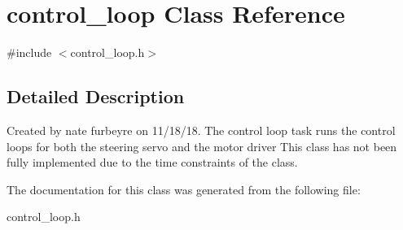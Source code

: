 \hypertarget{classcontrol__loop}{}\section{control\+\_\+loop Class Reference}
\label{classcontrol__loop}


{\ttfamily \#include $<$control\+\_\+loop.\+h$>$}



\subsection{Detailed Description}
Created by nate furbeyre on 11/18/18. The control loop task runs the control loops for both the steering servo and the motor driver This class has not been fully implemented due to the time constraints of the class. 

The documentation for this class was generated from the following file\+:\begin{DoxyCompactItemize}
\item 
control\+\_\+loop.\+h\end{DoxyCompactItemize}
